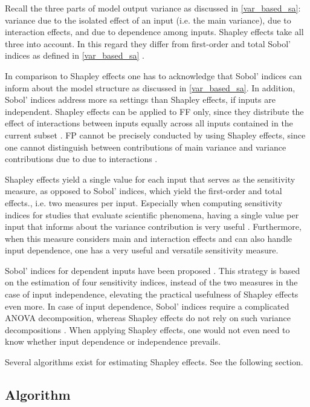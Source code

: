 Recall the three parts of model output variance as discussed in \cref{var_based_sa}: variance due to the isolated effect of an input (i.e. the main variance), due to interaction effects, and due to dependence among inputs. Shapley effects take all three into account. In this regard they differ from first-order and total Sobol' indices as defined in \cref{var_based_sa} \citep{O14}.

In comparison to Shapley effects one has to acknowledge that Sobol' indices can inform about the model structure as discussed in \cref{var_based_sa}. In addition, Sobol' indices address more sa settings than Shapley effects, if inputs are independent. Shapley effects can be applied to FF only, since they distribute the effect of interactions between inputs equally across all inputs contained in the current subset \citep{IP19}. FP cannot be precisely conducted by using Shapley effects, since one cannot distinguish between contributions of main variance and variance contributions due to due to interactions \citep{IP19}.

Shapley effects yield a single value for each input that serves as the sensitivity measure, as opposed to Sobol' indices, which yield the first-order and total effects., i.e. two measures per input. Especially when computing sensitivity indices for studies that evaluate scientific phenomena, having a single value per input that informs about the variance contribution is very useful \citep{SNS16}. Furthermore, when this measure considers main and interaction effects and can also handle input dependence, one has a very useful and versatile sensitivity measure.

Sobol' indices for dependent inputs have been proposed \citep{MTA15}. This strategy is based on the estimation of four sensitivity indices, instead of the two measures in the case of input independence, elevating the practical usefulness of Shapley effects even more. In case of input dependence, Sobol' indices require a complicated ANOVA decomposition, whereas Shapley effects do not rely on such variance decompositions \citep{IP19}. When applying Shapley effects, one would not even need to know whether input dependence or independence prevails.

Several algorithms exist for estimating Shapley effects. See the following section.

\subsection{Algorithm} \label{comp_alg}


